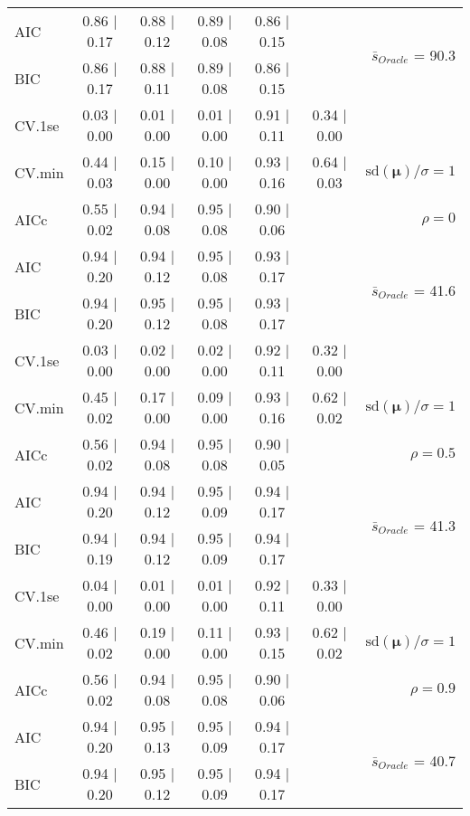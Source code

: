 \begin{table}
\begin{center}
\begin{tabular}{l*{5}{c}|r}
AIC & 0.86 $\mid$ 0.17 & 0.88 $\mid$ 0.12 & 0.89 $\mid$ 0.08 & 0.86 $\mid$ 0.15 & &  \multirow{2}{*}{$\bar{s}_{Oracle}$ = 90.3} \\
BIC & 0.86 $\mid$ 0.17 & 0.88 $\mid$ 0.11 & 0.89 $\mid$ 0.08 & 0.86 $\mid$ 0.15 & &  \\
 \hline 
CV.1se & 0.03 $\mid$ 0.00 & 0.01 $\mid$ 0.00 & 0.01 $\mid$ 0.00 & 0.91 $\mid$ 0.11 & 0.34 $\mid$ 0.00 & \\
CV.min & 0.44 $\mid$ 0.03 & 0.15 $\mid$ 0.00 & 0.10 $\mid$ 0.00 & 0.93 $\mid$ 0.16 & 0.64 $\mid$ 0.03 &  $\mathrm{sd}(\mathbf{\mu})/\sigma=1$ \\
AICc & 0.55 $\mid$ 0.02 & 0.94 $\mid$ 0.08 & 0.95 $\mid$ 0.08 & 0.90 $\mid$ 0.06 & & $\rho=0$ \\
AIC & 0.94 $\mid$ 0.20 & 0.94 $\mid$ 0.12 & 0.95 $\mid$ 0.08 & 0.93 $\mid$ 0.17 & &  \multirow{2}{*}{$\bar{s}_{Oracle}$ = 41.6} \\
BIC & 0.94 $\mid$ 0.20 & 0.95 $\mid$ 0.12 & 0.95 $\mid$ 0.08 & 0.93 $\mid$ 0.17 & &  \\
 \hline 
CV.1se & 0.03 $\mid$ 0.00 & 0.02 $\mid$ 0.00 & 0.02 $\mid$ 0.00 & 0.92 $\mid$ 0.11 & 0.32 $\mid$ 0.00 & \\
CV.min & 0.45 $\mid$ 0.02 & 0.17 $\mid$ 0.00 & 0.09 $\mid$ 0.00 & 0.93 $\mid$ 0.16 & 0.62 $\mid$ 0.02 &  $\mathrm{sd}(\mathbf{\mu})/\sigma=1$ \\
AICc & 0.56 $\mid$ 0.02 & 0.94 $\mid$ 0.08 & 0.95 $\mid$ 0.08 & 0.90 $\mid$ 0.05 & & $\rho=0.5$ \\
AIC & 0.94 $\mid$ 0.20 & 0.94 $\mid$ 0.12 & 0.95 $\mid$ 0.09 & 0.94 $\mid$ 0.17 & &  \multirow{2}{*}{$\bar{s}_{Oracle}$ = 41.3} \\
BIC & 0.94 $\mid$ 0.19 & 0.94 $\mid$ 0.12 & 0.95 $\mid$ 0.09 & 0.94 $\mid$ 0.17 & &  \\
 \hline 
CV.1se & 0.04 $\mid$ 0.00 & 0.01 $\mid$ 0.00 & 0.01 $\mid$ 0.00 & 0.92 $\mid$ 0.11 & 0.33 $\mid$ 0.00 & \\
CV.min & 0.46 $\mid$ 0.02 & 0.19 $\mid$ 0.00 & 0.11 $\mid$ 0.00 & 0.93 $\mid$ 0.15 & 0.62 $\mid$ 0.02 &  $\mathrm{sd}(\mathbf{\mu})/\sigma=1$ \\
AICc & 0.56 $\mid$ 0.02 & 0.94 $\mid$ 0.08 & 0.95 $\mid$ 0.08 & 0.90 $\mid$ 0.06 & & $\rho=0.9$ \\
AIC & 0.94 $\mid$ 0.20 & 0.95 $\mid$ 0.13 & 0.95 $\mid$ 0.09 & 0.94 $\mid$ 0.17 & &  \multirow{2}{*}{$\bar{s}_{Oracle}$ = 40.7} \\
BIC & 0.94 $\mid$ 0.20 & 0.95 $\mid$ 0.12 & 0.95 $\mid$ 0.09 & 0.94 $\mid$ 0.17 & &  \\

\end{tabular}
\end{center}
\end{table}
